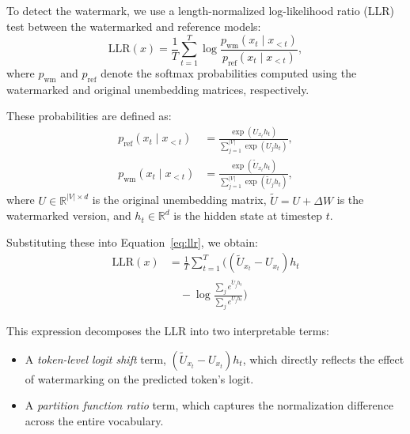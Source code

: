 To detect the watermark, we use a length-normalized log-likelihood ratio (LLR) test between the watermarked and reference models:
\begin{equation} \label{eq:llr}
    \text{LLR}(x) = \frac{1}{T} \sum_{t=1}^{T} \log \frac{p_{\text{wm}}(x_t \mid x_{<t})}{p_{\text{ref}}(x_t \mid x_{<t})},
\end{equation}
where \( p_{\text{wm}} \) and \( p_{\text{ref}} \) denote the softmax probabilities computed using the watermarked and original unembedding matrices, respectively.

These probabilities are defined as:
\begin{align}
    p_{\text{ref}}(x_t \mid x_{<t}) & =
    \frac{\exp(U_{x_t} h_t)}{\sum_{j=1}^{|V|} \exp(U_j h_t)}, \\
    p_{\text{wm}}(x_t \mid x_{<t})  & =
    \frac{\exp(\tilde{U}_{x_t} h_t)}{\sum_{j=1}^{|V|} \exp(\tilde{U}_j h_t)},
\end{align}
where \( U \in \mathbb{R}^{|V| \times d} \) is the original unembedding matrix, \( \tilde{U} = U + \Delta W \) is the watermarked version, and \( h_t \in \mathbb{R}^d \) is the hidden state at timestep \( t \).

Substituting these into Equation~\ref{eq:llr}, we obtain:
\begin{equation}
    \begin{aligned}
        \text{LLR}(x)
         & = \frac{1}{T} \sum_{t=1}^{T} \Big(
        (\tilde{U}_{x_t} - U_{x_t}) h_t                                       \\
         & \quad - \log \frac{\sum_j e^{\tilde{U}_j h_t}}{\sum_j e^{U_j h_t}}
        \Big)
    \end{aligned}
\end{equation}

This expression decomposes the LLR into two interpretable terms:
\begin{itemize}
    \item A \textit{token-level logit shift} term, \( (\tilde{U}_{x_t} - U_{x_t}) h_t \), which directly reflects the effect of watermarking on the predicted token's logit.
    \item A \textit{partition function ratio} term, which captures the normalization difference across the entire vocabulary.
\end{itemize}

